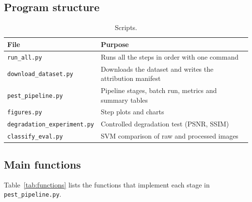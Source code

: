 \documentclass[12pt,a4paper]{article}
\begin{document}
\subsection{Program structure}
\begin{table}[H]
\centering
\caption{Scripts.}
\small
\begin{tabular}{ll}
\toprule
File & Purpose \\
\midrule
\texttt{run\_all.py} & Runs all the steps in order with one command \\
\texttt{download\_dataset.py} & Downloads the dataset and writes the attribution manifest \\
\texttt{pest\_pipeline.py} & Pipeline stages, batch run, metrics and summary tables \\
\texttt{figures.py} & Step plots and charts \\
\texttt{degradation\_experiment.py} & Controlled degradation test (PSNR, SSIM) \\
\texttt{classify\_eval.py} & SVM comparison of raw and processed images \\
\bottomrule
\end{tabular}
\end{table}

\subsection{Main functions}
Table~\ref{tab:functions} lists the functions that implement each stage in \texttt{pest\_pipeline.py}.
\end{document}
